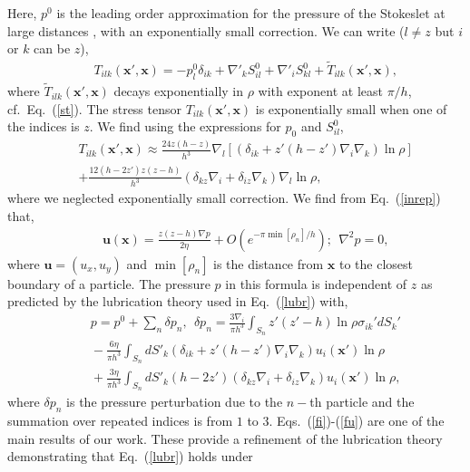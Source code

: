 Here, $p^0$ is the leading order approximation for the pressure of the Stokeslet at large distances \cite{LironMochon}, with an exponentially small correction.
We can write ($l\neq z$ but $i$ or $k$ can be  $z$),
\begin{eqnarray}&&\!\!\!\!\!\!\!\!\!\!
T_{ilk}(\bm x', \bm x)=-p^0_l\delta_{ik}+\nabla'_k S^0_{il}+\nabla'_i S^0_{kl}\!+\!{\tilde T}_{ilk}(\bm x', \bm x),
\end{eqnarray}
where ${\tilde T}_{ilk}(\bm x', \bm x)$ decays exponentially in $\rho$ with exponent at least $\pi/h$, cf.\ Eq.~(\ref{st}). The stress tensor $T_{ilk}(\bm x', \bm x)$
is exponentially small when one of the indices is $z$.
We find using the expressions for $p_0$ and $S^0_{il}$,
\begin{eqnarray}&&
T_{ilk}(\bm x', \bm x)\approx \frac{24z(h-z)}{h^3}\nabla_l\left[ \left(\delta_{ik}+z'(h\!-\!z')\nabla_i \nabla_k \right)\ln \rho\right]\nonumber\\&&
+\frac{12 (h\!-\!2z')z(z\!-\!h)}{h^3}\left(\delta_{kz}\nabla_i+\delta_{iz}\nabla_k \right) \nabla_l\ln \rho,
\end{eqnarray}
where we neglected exponentially small correction. We find from Eq.~(\ref{inrep}) that,
\begin{eqnarray}&&\!\!\!\!\!\!\!\!\!\!
\bm u(\bm x)\!=\!\frac{z(z\!-\!h)\nabla p}{2\eta}+O\left(e^{-\pi\min[\rho_n]/h}\right)\!;\ \ \nabla^2 p\!=\!0,\label{fi}
\end{eqnarray}
where  
$\bm u=(u_x, u_y)$ and $\min[\rho_n]$ is the distance from $\bm x$ to the closest boundary of a particle. 
The pressure $p$ in this formula is independent of $z$ as predicted by the lubrication theory used in Eq.~(\ref{lubr}) with,
\begin{eqnarray}&&\!\!\!\!\!\!
p=p^0+\sum_n \delta p_n,\ \ \delta p_n=\frac{3\nabla_i}{\pi h^3}\int_{S_n}z'(z'-h) \ln \rho \sigma_{ik}'dS_k'\nonumber
\\&&\!\!\!\!\!\!
-\frac{6\eta}{\pi h^3} \int_{S_n} dS'_k  \left(\delta_{ik}+z'(h\!-\!z')\nabla_i \nabla_k \right) u_{i}(\bm x') \ln \rho\nonumber\\&&\!\!\!\!\!\!
+\frac{3\eta}{\pi h^3} \int_{S_n} dS'_k  (h\!-\!2z')\left(\delta_{kz}\nabla_i+\delta_{iz}\nabla_k \right) u_{i}(\bm x') \ln \rho,\label{fu}
\end{eqnarray}
where $\delta p_n$ is the pressure perturbation due to the $n-$th particle and the summation over repeated indices is from $1$ to $3$. Eqs.~(\ref{fi})-(\ref{fu}) are one of the main results of our work. These provide a refinement of the lubrication theory demonstrating that Eq.~(\ref{lubr}) holds under
